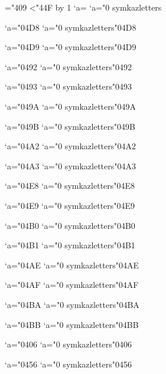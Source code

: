 \usepackage{booktabs}                 %
\usepackage{tabularx}                 %
\usepackage{longtable}                %
\usepackage{multirow}                 %
\usepackage{makecell}                 %
\usepackage{chngcntr}                 %
\usepackage{tabularray}


\usepackage{graphicx}                 %
\usepackage{svg}                      %
\usepackage{float}                    %
\usepackage{subcaption}               %

\usepackage{amsmath,amssymb}                  %
\usepackage{unicode-math}             %

\newcommand{\makekazmathletter}[1]{%
  \begingroup\lccode`a=#1\lowercase{\endgroup
  \Umathcode`a}="0 \csname symkazletters\endcsname\space #1
}

="409
\loop\ifnum{}<"44F
  \advance{} by 1
  \makekazmathletter{\count255}
\repeat

\makekazmathletter{"04D8}
\makekazmathletter{"04D9}
\makekazmathletter{"0492}
\makekazmathletter{"0493}
\makekazmathletter{"049A}
\makekazmathletter{"049B}
\makekazmathletter{"04A2}
\makekazmathletter{"04A3}
\makekazmathletter{"04E8}
\makekazmathletter{"04E9}
\makekazmathletter{"04B0}
\makekazmathletter{"04B1}
\makekazmathletter{"04AE}
\makekazmathletter{"04AF}
\makekazmathletter{"04BA}
\makekazmathletter{"04BB}
\makekazmathletter{"0406}
\makekazmathletter{"0456}

